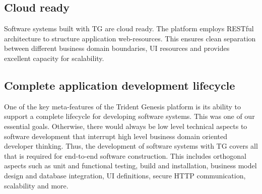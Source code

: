 \documentclass[a4paper,12pt,oneside,openright,final]{memoir} %
\begin{document}
    
    
\subsection*{Cloud ready}
	Software systems built with TG are cloud ready.
	The platform employs RESTful architecture to structure application web-resources.
	This ensures clean separation between different business domain boundaries, UI resources and provides excellent capacity for scalability.

\subsection*{Complete application development lifecycle}
	One of the key meta-features of the Trident Genesis platform is its ability to support a complete lifecycle for developing software systems.
	This was one of our essential goals.
	Otherwise, there would always be low level technical aspects to software development that interrupt high level business domain oriented developer thinking.
	Thus, the development of software systems with TG covers all that is required for end-to-end software construction.
	This includes orthogonal aspects such as unit and functional testing, build and installation, business model design and database integration, UI definitions, secure HTTP communication, scalability and more.

\fi
\end{document}
